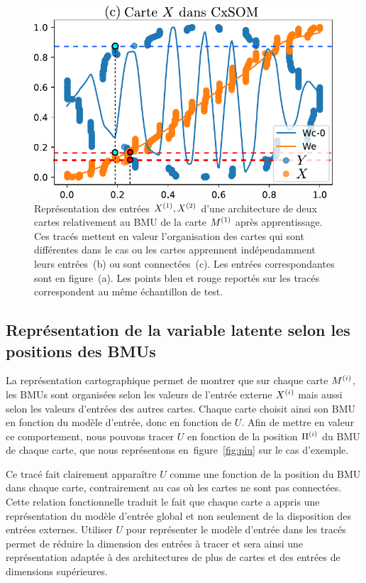 \documentclass[../main]{subfiles}
\begin{document}
\begin{figure}
\begin{minipage}{0.38\textwidth}
\includegraphics[width=\textwidth]{weights_2som.pdf}
\end{minipage}

\caption{Représentation des entrées $X^{({1})},X^{({2})}$ d'une architecture de deux cartes relativement au BMU de la carte $M^{({1})}$ après apprentissage. Ces tracés mettent en valeur l'organisation des cartes qui sont différentes dans le cas ou les cartes apprennent indépendamment leurs entrées~(b) ou sont connectées~(c). Les entrées correspondantes sont en figure~(a). Les points bleu et rouge reportés sur les tracés correspondent au même échantillon de test.\label{fig:inputs}}
\end{figure}

\subsection{Représentation de la variable latente selon les positions des BMUs}\label{sec:u_bmu}

La représentation cartographique permet de montrer que sur chaque carte $M^{({i})}$, les BMUs sont organisées selon les valeurs de l'entrée externe $X^{({i})}$ mais aussi selon les valeurs d'entrées des autres cartes. 
Chaque carte choisit ainsi son BMU en fonction du modèle d'entrée, donc en fonction de $U$.
Afin de mettre en valeur ce comportement, nous pouvons tracer $U$ en fonction de la position $\Pi^{({i})}$ du BMU de chaque carte, que nous représentons en~figure~\ref{fig:piu} sur le cas d'exemple.

Ce tracé fait clairement apparaître $U$ comme une fonction de la position du BMU dans chaque carte, contrairement au cas où les cartes ne sont pas connectées. 
Cette relation fonctionnelle traduit le fait que chaque carte a appris une représentation du modèle d'entrée global et non seulement de la disposition des entrées externes.
Utiliser $U$ pour représenter le modèle d'entrée dans les tracés permet de réduire la dimension des entrées à tracer
et sera ainsi une représentation adaptée à des architectures de plus de cartes et des entrées de dimensions supérieures.
\end{document}
